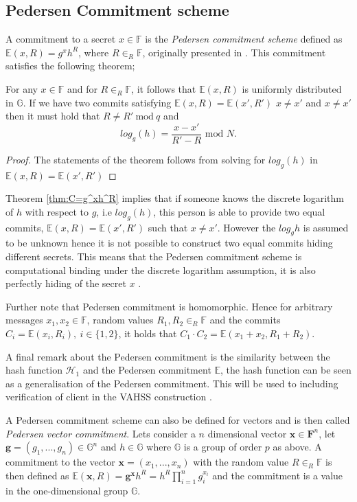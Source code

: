 \subsection*{Pedersen Commitment scheme}
A commitment to a secret $x\in\mathds{F}$ is the \textit{Pedersen commitment scheme} defined as $\mathds{E}(x,R)=g^xh^R$, where $R\in_R\mathds{F}$,  originally presented in \cite{pedersen}. This commitment satisfies the following theorem;
\\
\begin{thm}
\label{thm:C=g^xh^R}
For any $x\in\mathds{F}$ and for $R\in_R\mathds{F}$, it follows that   $\mathds{E}(x,R)$ is uniformly distributed in $\mathds{G}$. If we have two commits satisfying $\mathds{E}(x,R)=\mathds{E}(x',R')$  $x\neq x'$ and  $x\neq x'$ then it must hold that $R\neq R' \:\text{mod}\:q$ and 
\begin{equation}
\label{eq:pedersen_binidng}
    log_g(h) = \frac{x-x'}{R'-R} \text{ mod }N.
\end{equation}
\end{thm}
\begin{proof}
The statements of the theorem follows from solving for $log_g(h)$ in $\mathds{E}(x,R)=\mathds{E}(x',R')$ 
\end{proof}

Theorem \ref{thm:C=g^xh^R} implies that if someone knows the discrete logarithm of $h$ with respect to $g$, i.e $log_g(h)$, this person is able to provide two equal commits, $\mathds{E}(x,R)=\mathds{E}(x',R')$ such that $x\neq x'$. However the $log_g h$ is assumed to be unknown hence it is not possible to construct two equal commits hiding different secrets. This means that the Pedersen commitment scheme is computational binding under the discrete logarithm assumption, it is also perfectly hiding of the secret $x$ \cite{pedersen}. 

Further note that Pedersen commitment is homomorphic. Hence for arbitrary messages $x_1,x_2\in\mathds{F}$, random values $R_1,R_2\in_R\mathds{F}$ and the commits $C_i=\mathds{E}(x_i,R_i),\:i\in\{1,2\}$, it holds that $C_1\cdot C_2 = \mathds{E}(x_1+x_2,R_1+R_2)$.

A final remark about the Pedersen commitment is the similarity between the hash function $\mathcal{H}_1$ and the Pedersen commitment $\mathds{E}$, the hash function can be seen as a generalisation of the Pedersen commitment. This will be used to including verification of client in the VAHSS construction \cite{SumItUp}.

A Pedersen commitment scheme can also be defined for vectors and is then called \textit{Pedersen vector commitment}. Lets consider a $n$ dimensional vector $\mathbf{x}\in\mathbf{F}^n$, let $\mathbf{g}=(g_1,...,g_n) \in\mathds{G}^n$ and $h\in\mathds{G}$ where $\mathds{G}$ is a group of order $p$ as above. A commitment to the vector  $\mathbf{x}=(x_1,...,x_n)$  with the random value $R\in_R \mathds{F}$ is then defined as $\mathds{E}(\mathbf{x},R) = \mathbf{g}^\mathbf{x}h^R = h^R\prod_{i=1}^n g_i^{x_i}$ and the commitment is a value in the one-dimensional group $\mathds{G}$. 

